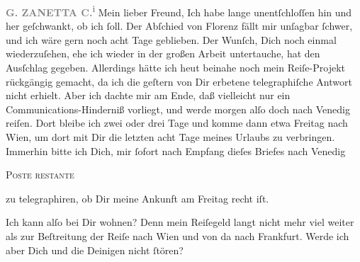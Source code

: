 \pstart
           \textcolor{gray}{\textbf{G. ZANETTA C.\textsuperscript{i}}}\pend
           \vspace{0.5em}
\pstart
           Mein lieber Freund, Ich habe lange unentſchloſſen hin
               und her geſchwankt, ob ich \label{K_L02889-1v}\label{K_L02889-1} ſoll. Der Abſchied von Florenz fällt mir unſagbar ſchwer, und ich wäre gern noch acht
               Tage geblieben. Der Wunſch, Dich noch einmal wiederzuſehen, ehe ich wieder in der
               großen Arbeit untertauche, hat \strikeout{\textcolor{gray}{f}} den Ausſchlag gegeben. Allerdings hätte ich heut beinahe noch mein Reiſe-Projekt rückgängig gemacht, da ich die geſtern von Dir erbetene telegraphiſche Antwort nicht
               erhielt. Aber ich dachte mir am Ende, daß vielleicht nur ein Communications-Hinderniß
               vorliegt, und werde morgen alſo doch nach Venedig reiſen. {\pb}Dort bleibe ich zwei oder drei Tage und komme dann etwa Freitag nach Wien, um dort mit Dir die
               letzten acht Tage meines Urlaubs zu verbringen. Immerhin bitte ich Dich, mir ſofort
               nach Empfang dieſes Briefes nach Venedig\begin{otherlanguage}{french}\textsc{Poste restante}\end{otherlanguage}{ }zu telegraphiren, ob Dir meine Ankunft am Freitag recht iſt.\pend
           
\pstart
           Ich kann alſo bei Dir wohnen? Denn mein Reiſegeld langt nicht mehr viel weiter als
               zur Beſtreitung der Reiſe nach Wien und von da
               nach Frankfurt. Werde ich aber Dich und die
               Deinigen nicht ſtören?\pend
           
